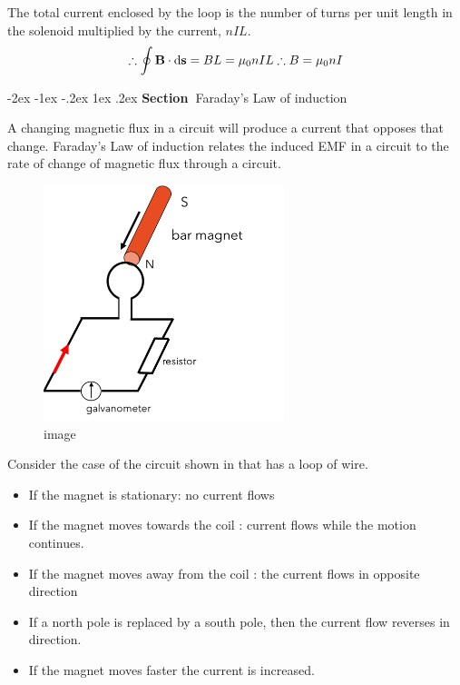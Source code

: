 \documentclass[
]{book}
\makeatletter
\renewcommand\section{%
\@startsection{section}{1}{\z@}%
              {-2ex \@plus -1ex \@minus -.2ex}%
              {1ex \@plus .2ex}%
              {\sffamily\bfseries\large\noindent Section~}}
\numberwithin{equation}{section}
\makeatother
\begin{document}
The total current enclosed by the loop is the number of turns per unit
length in the solenoid multiplied by the current, \(nIL\).
\begin{equation}
\label{eq:ointB3}
\therefore \oint \mathbf{B} \cdot \mathrm{d}\mathbf{s} = BL = \mu_0 nIL \\
\therefore B = \mu_0 nI
\end{equation}

\hypertarget{faradays-law-of-induction}{%
\section{Faraday's Law of induction}\label{faradays-law-of-induction}}

A changing magnetic flux in a circuit will produce a current that
opposes that change. Faraday's Law of induction relates the induced EMF
in a circuit to the rate of change of magnetic flux through a circuit.

\begin{figure}
\centering
\includegraphics[width=70mm,height=\textheight]{Figures/circuit_GR.png}
\caption{image}
\end{figure}

Consider the case of the circuit shown in that has a loop of wire.

\begin{itemize}
\item
  If the magnet is stationary: no current flows
\item
  If the magnet moves towards the coil : current flows while the
  motion continues.
\item
  If the magnet moves away from the coil : the current flows in
  opposite direction
\item
  If a north pole is replaced by a south pole, then the current flow
  reverses in direction.
\item
  If the magnet moves faster the current is increased.
\end{itemize}
\end{document}
